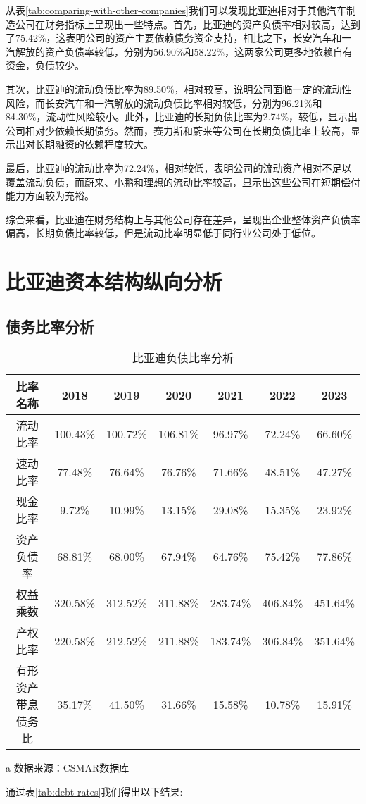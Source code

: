 从表\eqref{tab:comparing-with-other-companies}我们可以发现比亚迪相对于其他汽车制造公司在财务指标上呈现出一些特点。首先，比亚迪的资产负债率相对较高，达到了75.42\%，这表明公司的资产主要依赖债务资金支持，相比之下，长安汽车和一汽解放的资产负债率较低，分别为56.90\%和58.22\%，这两家公司更多地依赖自有资金，负债较少。

其次，比亚迪的流动负债比率为89.50\%，相对较高，说明公司面临一定的流动性风险，而长安汽车和一汽解放的流动负债比率相对较低，分别为96.21\%和84.30\%，流动性风险较小。此外，比亚迪的长期负债比率为2.74\%，较低，显示出公司相对少依赖长期债务。然而，赛力斯和蔚来等公司在长期负债比率上较高，显示出对长期融资的依赖程度较大。

最后，比亚迪的流动比率为72.24\%，相对较低，表明公司的流动资产相对不足以覆盖流动负债，而蔚来、小鹏和理想的流动比率较高，显示出这些公司在短期偿付能力方面较为充裕。

综合来看，比亚迪在财务结构上与其他公司存在差异，呈现出企业整体资产负债率偏高，长期负债比率较低，但是流动比率明显低于同行业公司处于低位。
\section{比亚迪资本结构纵向分析}


\subsection{债务比率分析}
\begin{table}
  \centering
  \begin{threeparttable}[c]
    \caption{比亚迪负债比率分析}
    \label{tab:debt-rates}
    \begin{tabular}{ccccccc}
      \toprule
        比率名称 & 2018 & 2019 & 2020 & 2021 & 2022 & 2023 \\ 
      \midrule
        流动比率 & 100.43\% & 100.72\% & 106.81\% & 96.97\% & 72.24\% & 66.60\% \\ 
        速动比率 & 77.48\% & 76.64\% & 76.76\% & 71.66\% & 48.51\% & 47.27\% \\ 
        现金比率 & 9.72\% & 10.99\% & 13.15\% & 29.08\% & 15.35\% & 23.92\% \\ 
        资产负债率 & 68.81\% & 68.00\% & 67.94\% & 64.76\% & 75.42\% & 77.86\% \\
        权益乘数 & 320.58\% & 312.52\% & 311.88\% & 283.74\% & 406.84\% & 451.64\% \\ 
        产权比率 & 220.58\% & 212.52\% & 211.88\% & 183.74\% & 306.84\% & 351.64\% \\ 
        有形资产带息债务比 & 35.17\% & 41.50\% & 31.66\% & 15.58\% & 10.78\% & 15.91\% \\ 
      \bottomrule
    \end{tabular}
    \begin{tablenotes}
      \item [a] 数据来源：CSMAR数据库
    \end{tablenotes}
  \end{threeparttable}
\end{table}
通过表\eqref{tab:debt-rates}我们得出以下结果:

